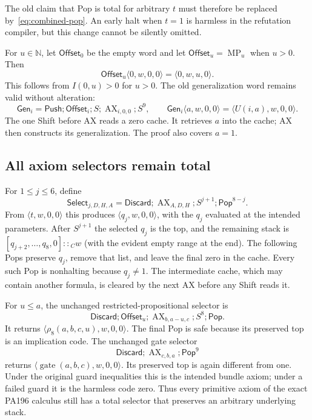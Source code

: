 The old claim that Pop is total for arbitrary $t$ must therefore be replaced
by~\eqref{eq:combined-pop}.  An early halt when $t=1$ is harmless in the
refutation compiler, but this change cannot be silently omitted.

For $u\in\mathbb N$, let $\mathsf{Offset}_0$ be the empty word and let
$\mathsf{Offset}_u=\operatorname{MP}_u$ when $u>0$.  Then
\[
 \mathsf{Offset}_u\langle0,w,0,0\rangle=\langle0,w,u,0\rangle.
\]
This follows from $I(0,u)>0$ for $u>0$.  The old generalization word remains
valid without alteration:
\[
 \mathsf{Gen}_i=\mathsf{Push};\mathsf{Offset}_i;S;
          \operatorname{AX}_{i,0,0};S^9,
 \qquad
 \mathsf{Gen}_i\langle a,w,0,0\rangle
       =\langle U(i,a),w,0,0\rangle.
\]
The one Shift before AX reads a zero cache.  It retrieves $a$ into the cache;
AX then constructs its generalization.  The proof also covers $a=1$.

\subsection{All axiom selectors remain total}

For $1\le j\le6$, define
\[
 \mathsf{Select}_{j,D,H,A}=
 \mathsf{Discard};\operatorname{AX}_{A,D,H};S^{j+1};\mathsf{Pop}^{8-j}.
\]
From $\langle t,w,0,0\rangle$ this produces
$\langle q_j,w,0,0\rangle$, with the $q_j$ evaluated at the intended
parameters.  After $S^{j+1}$ the selected $q_j$ is the top, and the remaining
stack is $[q_{j+2},\ldots,q_8,0]\mathbin{::}_C w$ (with the evident empty
range at the end).  The following Pops preserve $q_j$, remove that list,
and leave the final zero in the cache.  Every such Pop is nonhalting because
$q_j\ne1$.  The intermediate cache, which may contain another formula,
is cleared by the next AX before any Shift reads it.

For $u\le a$, the unchanged restricted-propositional selector is
\[
 \mathsf{Discard};\mathsf{Offset}_u;
 \operatorname{AX}_{b,a-u,c};S^8;\mathsf{Pop}.
\]
It returns $\langle\rho_8(a,b,c,u),w,0,0\rangle$.  The final Pop is safe
because its preserved top is an implication code.  The unchanged gate
selector
\[
 \mathsf{Discard};\operatorname{AX}_{c,b,a};\mathsf{Pop}^9
\]
returns $\langle\operatorname{gate}(a,b,c),w,0,0\rangle$.  Its preserved
top is again different from one.  Under the original guard inequalities this
is the intended bundle axiom; under a failed guard it is the harmless code
zero.  Thus every primitive axiom of the exact PA196 calculus still has a
total selector that preserves an arbitrary underlying stack.


